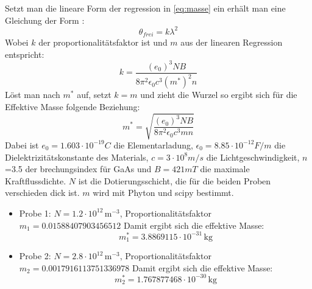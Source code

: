 Setzt man die lineare Form der regression in \eqref{eq:masse} ein erhält man eine Gleichung der Form :
\begin{equation}
    \theta_{frei}=k\lambda^2
\end{equation}
Wobei $k$ der proportionalitätsfaktor ist und $m$ aus der linearen Regression entspricht:
\begin{equation}
    k=\frac{(e_0)^3NB}{8\pi^2\epsilon_0 c^3(m^*)^2 n}
\end{equation}
Löst man nach $m^*$ auf, setzt $k=m$ und zieht die Wurzel so ergibt sich für die Effektive Masse 
folgende Beziehung:
\begin{equation}
    m^*=\sqrt{\frac{(e_0)^3NB}{8\pi^2 \epsilon_0 c^3 m n}}
\end{equation}   
Dabei ist $e_0=1.603\cdot10^{-19}C$ die Elementarladung, $\epsilon_0=8.85\cdot10^{-12}F/m$ die Dielektrizitätskonstante des Materials,
$c=3\cdot10^8 m/s$ die Lichtgeschwindigkeit, $n$=3.5 der brechungsindex für GaAs und $B= 421 mT$ die maximale Kraftflussdichte.
$N$ ist die Dotierungsschicht, die für die beiden Proben verschieden dick ist.
$m$ wird mit Phyton und scipy bestimmt.

\begin{itemize} 
    \item Probe 1: \(N = 1.2 \cdot 10^{12} \, \text{m}^{-3}\), Proportionalitätsfaktor \(m_1 = 0.01588407903456512\)
Damit ergibt sich die effektive Masse:
\begin{equation} m^*_1 = 3.8869115 \cdot 10^{-31} \, \text{kg}
\end{equation}
\item Probe 2: \(N = 2.8 \cdot 10^{12} \, \text{m}^{-3}\), Proportionalitätsfaktor \(m_2 = 0.0017916113751336978\)
Damit ergibt sich die effektive Masse:
\begin{equation} m^*_2 = 1.767877468 \cdot 10^{-30} \, \text{kg} 
\end{equation} 
\end{itemize}

    
    















